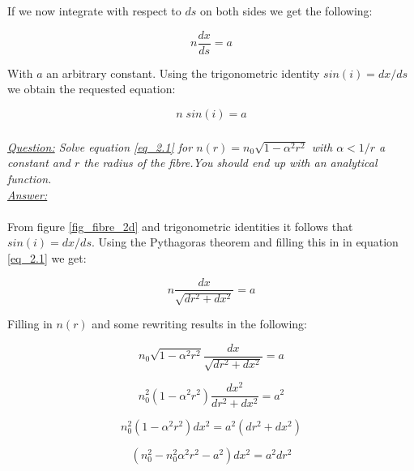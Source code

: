 \documentclass{article}
\begin{document}
If we now integrate with respect to $ds$ on both sides we get the following:

\begin{equation}
	n \frac{d x}{ds} = a
\end{equation}

With $a$ an arbitrary constant. Using the trigonometric identity $sin(i)= dx/ds$ we obtain the requested equation:

\begin{equation}
	n \; sin(i) = a
\end{equation}

\subsubsection{}

\textit{\underline{Question:} Solve equation \ref{eq_2.1} for $n(r) = n_0 \sqrt{1 - \alpha ^2 r^2}$ with $\alpha < 1/r$ a constant and $r$ the radius of the fibre.You should end up with an analytical function.}
\\
\textit{\underline{Answer:}} \\
\\



From figure \ref{fig_fibre_2d} and trigonometric identities it follows that $ sin(i) = dx/ds$. Using the Pythagoras theorem and filling this in in equation \ref{eq_2.1} we get:

\begin{equation}
	n  \frac{dx}{\sqrt{dr^2 + dx^2}} = a
\end{equation}

Filling in $n(r)$ and some rewriting results in the following:

\begin{equation}
	n_0 \sqrt{1 - \alpha ^2 r^2}  \frac{dx}{\sqrt{dr^2 + dx^2}} = a
\end{equation}

\begin{equation}
	n_0^2 (1 - \alpha ^2 r^2)  \frac{dx^2}{dr^2 + dx^2} = a^2
\end{equation}

\begin{equation}
	n_0^2 (1 - \alpha ^2 r^2)  dx^2 = a^2 (dr^2 + dx^2)
\end{equation}

\begin{equation}
	(n_0 ^2 - n_0^2 \alpha ^2 r^2 - a^2)  dx^2 = a^2 dr^2
\end{equation}
\end{document}
